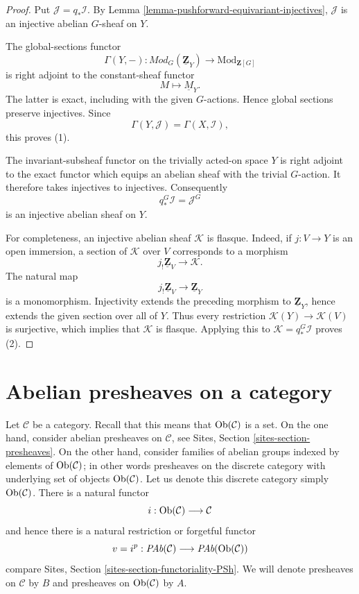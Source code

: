 \begin{proof}
Put $\mathcal{J} = q_*\mathcal{I}$. By Lemma
\ref{lemma-pushforward-equivariant-injectives}, $\mathcal{J}$ is an
injective abelian $G$-sheaf on $Y$.

The global-sections functor
$$
\Gamma(Y, -) :
\textit{Mod}_G(\underline{\mathbf{Z}}_Y)
\longrightarrow
\text{Mod}_{\mathbf{Z}[G]}
$$
is right adjoint to the constant-sheaf functor
$$
M \longmapsto \underline{M}_Y.
$$
The latter is exact, including with the given $G$-actions. Hence global
sections preserve injectives. Since
$$
\Gamma(Y, \mathcal{J}) = \Gamma(X, \mathcal{I}),
$$
this proves (1).

The invariant-subsheaf functor on the trivially acted-on space $Y$ is
right adjoint to the exact functor which equips an abelian sheaf with the
trivial $G$-action. It therefore takes injectives to injectives.
Consequently
$$
q_*^G\mathcal{I} = \mathcal{J}^G
$$
is an injective abelian sheaf on $Y$.

For completeness, an injective abelian sheaf $\mathcal{K}$ is flasque.
Indeed, if $j : V \to Y$ is an open immersion, a section of
$\mathcal{K}$ over $V$ corresponds to a morphism
$$
j_!\underline{\mathbf{Z}}_V \longrightarrow \mathcal{K}.
$$
The natural map
$$
j_!\underline{\mathbf{Z}}_V
\longrightarrow
\underline{\mathbf{Z}}_Y
$$
is a monomorphism. Injectivity extends the preceding morphism to
$\underline{\mathbf{Z}}_Y$, hence extends the given section over all of
$Y$. Thus every restriction
$\mathcal{K}(Y) \to \mathcal{K}(V)$ is surjective, which implies that
$\mathcal{K}$ is flasque. Applying this to
$\mathcal{K} = q_*^G\mathcal{I}$ proves (2).
\end{proof}





















\section{Abelian presheaves on a category}
\label{section-injectives-presheaves}

\noindent
Let $\mathcal{C}$ be a category. Recall that this means that
$\mathop{\mathrm{Ob}}\nolimits(\mathcal{C})$ is a set. On the one hand, consider abelian
presheaves on $\mathcal{C}$, see
Sites, Section \ref{sites-section-presheaves}.
On the other hand, consider families of abelian groups
indexed by elements of $\mathop{\mathrm{Ob}}\nolimits(\mathcal{C})$; in other
words presheaves on the discrete category with underlying set
of objects $\mathop{\mathrm{Ob}}\nolimits(\mathcal{C})$. Let us denote this
discrete category simply $\mathop{\mathrm{Ob}}\nolimits(\mathcal{C})$.
There is a natural functor
$$
i : \mathop{\mathrm{Ob}}\nolimits(\mathcal{C}) \longrightarrow \mathcal{C}
$$
and hence there is a natural restriction or forgetful functor
$$
v = i^p :
\textit{PAb}(\mathcal{C})
\longrightarrow
\textit{PAb}(\mathop{\mathrm{Ob}}\nolimits(\mathcal{C}))
$$
compare Sites, Section \ref{sites-section-functoriality-PSh}.
We will denote presheaves
on $\mathcal{C}$ by $B$ and presheaves on
$\mathop{\mathrm{Ob}}\nolimits(\mathcal{C})$ by $A$.

